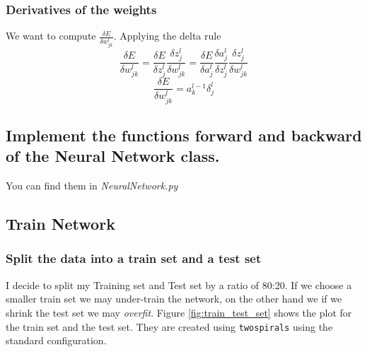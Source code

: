 \documentclass[11pt]{article}
\begin{document}
\subsubsection{Derivatives of the weights}
We want to compute $\frac{\delta E}{\delta w^l_{jk}}$. Applying the delta rule
\begin{equation}
\frac{\delta E}{\delta w^l_{jk}} = \frac{\delta E}{\delta z^l_j}\frac{\delta z^l_j}{\delta w^l_{jk}} =	
\frac{\delta E}{\delta a^l_j}\frac{\delta a^l_j}{\delta z^l_{j}}
\frac{\delta z^l_j}{\delta w^l_{jk}}
\end{equation}
\begin{equation}
\label{eq:derivativesWeigthDeltas}	
\frac{\delta E}{\delta w^l_{jk}} = a^{l-1}_k \delta^l_j
\end{equation}
\subsection{Implement the functions forward and backward of the Neural Network class.}
You can find them in \emph{NeuralNetwork.py}
\subsection{Train Network}
\subsubsection{ Split the data into a train set and a test set}
I decide to split my Training set and Test set by a ratio of 80:20. If we choose a smaller train set we may under-train the network, on the other hand we if we shrink the test set we may \emph{overfit}.
Figure \ref{fig:train_test_set} shows the plot for the train set and the test set. They are created using \texttt{twospirals} using the standard configuration.
\end{document}

